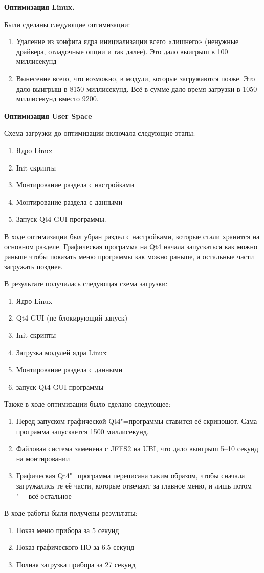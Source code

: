 \documentclass[10pt, a5paper]{article}
\begin{document}
\textbf{Оптимизация Linux.}

Были сделаны следующие оптимизации:

\begin{enumerate}
  \item Удаление из конфига ядра инициализации всего «лишнего» (ненужные драйвера, отладочные опции и так далее). Это дало выигрыш в 100 миллисекунд
  \item Вынесение всего, что возможно, в модули, которые загружаются позже. Это дало выигрыш в 8150 миллисекунд.
Всё в сумме дало время загрузки в 1050 миллисекунд вместо 9200.
\end{enumerate}

\textbf{Оптимизация User Space}

Схема загрузки до оптимизации включала следующие этапы:

\begin{enumerate}
  \item Ядро Linux
  \item Init скрипты
  \item Монтирование раздела с настройками
  \item Монтирование раздела с данными
  \item Запуск Qt4 GUI программы.
\end{enumerate}

В ходе оптимизации был убран раздел с настройками, которые стали хранится на основном разделе. Графическая программа на Qt4 начала запускаться как можно раньше чтобы показать меню программы как можно раньше, а остальные части загружать позднее.

В результате получилась следующая схема загрузки:

\begin{enumerate}
  \item Ядро Linux
  \item Qt4 GUI (не блокирующий запуск)
  \item Init скрипты
  \item Загрузка модулей ядра Linux
  \item Монтирование раздела с данными
  \item запуск Qt4 GUI программы
\end{enumerate}

Также в ходе оптимизации было сделано следующее:

\begin{enumerate}
  \item Перед запуском графической Qt4"=программы ставится её скриношот. Сама программа запускается 1500 миллисекунд.
  \item Файловая система заменена с JFFS2 на UBI, что дало выигрыш 5--10 секунд на монтировании
  \item Графическая Qt4"=программа переписана таким образом, чтобы сначала загружались те её части, которые отвечают за главное меню, и лишь потом "--- всё остальное
\end{enumerate}

В ходе работы были получены результаты:

\begin{enumerate}
  \item Показ меню прибора за 5 секунд
  \item Показ графического ПО за 6.5 секунд
  \item Полная загрузка прибора за 27 секунд
\end{enumerate}
\end{document}
